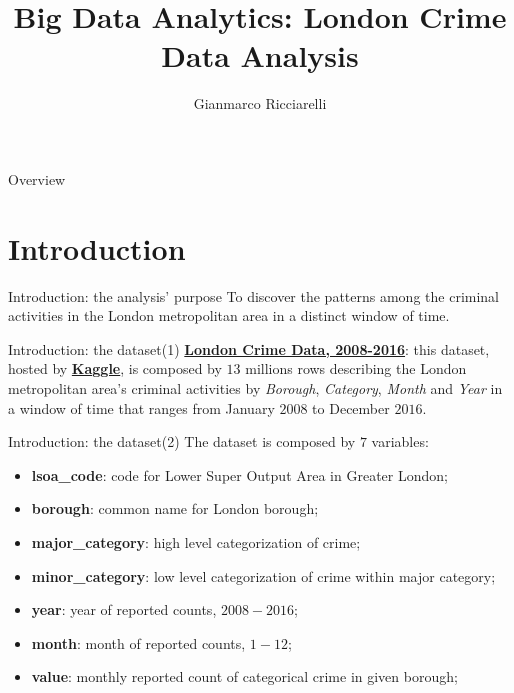 \documentclass[12pt]{beamer}
\title{Big Data Analytics: London Crime Data Analysis}
\author{Gianmarco Ricciarelli\inst{1}}
\institute{\inst{1}University of Pisa, \\
           \email{gianmarcoricciarelli@gmail.com}}
\date{}
\begin{document}
    \maketitle

    \begin{frame}{Overview}
        \tableofcontents
    \end{frame}

    \section{Introduction} %
    \label{sec:introduction}
        \begin{frame}{Introduction: the analysis' purpose}
            To discover the patterns among the criminal activities in the London metropolitan area in a
            distinct window of time.
        \end{frame}

        \begin{frame}{Introduction: the dataset(1)}
            \href{https://www.kaggle.com/jboysen/london-crime}{\textbf{London Crime Data, 2008-2016}}: this
            dataset, hosted by \href{https://www.kaggle.com}{\textbf{Kaggle}}, is composed by $13$
            millions rows describing the London metropolitan area's criminal activities by \textit{Borough},
            \textit{Category}, \textit{Month} and \textit{Year} in a window of time that ranges from
            January $2008$ to December $2016$.
        \end{frame}

        \begin{frame}{Introduction: the dataset(2)}
            The dataset is composed by $7$ variables:

            \begin{itemize}
                \item \textbf{lsoa\_code}: code for Lower Super Output Area in Greater London;
                \item \textbf{borough}: common name for London borough;
                \item \textbf{major\_category}: high level categorization of crime;
                \item \textbf{minor\_category}: low level categorization of crime within major category;
                \item \textbf{year}: year of reported counts, $2008-2016$;
                \item \textbf{month}: month of reported counts, $1-12$;
                \item \textbf{value}: monthly reported count of categorical crime in given borough;
            \end{itemize}
        \end{frame}
\end{document}
